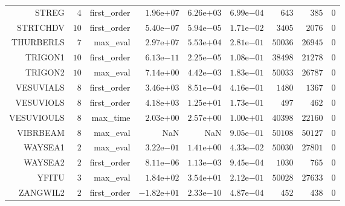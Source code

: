 \begin{longtable}{rrrrrrrrr}
STREG & \(     4\) & first\_order & \( 1.96\)e\(+07\) & \( 6.26\)e\(+03\) & \( 6.99\)e\(-04\) & \(   643\) & \(   385\) & \(     0\) \\
STRTCHDV & \(    10\) & first\_order & \( 5.40\)e\(-07\) & \( 5.94\)e\(-05\) & \( 1.71\)e\(-02\) & \(  3405\) & \(  2076\) & \(     0\) \\
THURBERLS & \(     7\) & max\_eval & \( 2.97\)e\(+07\) & \( 5.53\)e\(+04\) & \( 2.81\)e\(-01\) & \( 50036\) & \( 26945\) & \(     0\) \\
TRIGON1 & \(    10\) & first\_order & \( 6.13\)e\(-11\) & \( 2.25\)e\(-05\) & \( 1.08\)e\(-01\) & \( 38498\) & \( 21278\) & \(     0\) \\
TRIGON2 & \(    10\) & max\_eval & \( 7.14\)e\(+00\) & \( 4.42\)e\(-03\) & \( 1.83\)e\(-01\) & \( 50033\) & \( 26787\) & \(     0\) \\
VESUVIALS & \(     8\) & first\_order & \( 3.46\)e\(+03\) & \( 8.51\)e\(-04\) & \( 4.16\)e\(-01\) & \(  1480\) & \(  1367\) & \(     0\) \\
VESUVIOLS & \(     8\) & first\_order & \( 4.18\)e\(+03\) & \( 1.25\)e\(+01\) & \( 1.73\)e\(-01\) & \(   497\) & \(   462\) & \(     0\) \\
VESUVIOULS & \(     8\) & max\_time & \( 2.03\)e\(+00\) & \( 2.57\)e\(+00\) & \( 1.00\)e\(+01\) & \( 40398\) & \( 22160\) & \(     0\) \\
VIBRBEAM & \(     8\) & max\_eval &       NaN &       NaN & \( 9.05\)e\(-01\) & \( 50108\) & \( 50127\) & \(     0\) \\
WAYSEA1 & \(     2\) & max\_eval & \( 3.22\)e\(-01\) & \( 1.41\)e\(+00\) & \( 4.33\)e\(-02\) & \( 50030\) & \( 27801\) & \(     0\) \\
WAYSEA2 & \(     2\) & first\_order & \( 8.11\)e\(-06\) & \( 1.13\)e\(-03\) & \( 9.45\)e\(-04\) & \(  1030\) & \(   765\) & \(     0\) \\
YFITU & \(     3\) & max\_eval & \( 1.84\)e\(+02\) & \( 3.54\)e\(+01\) & \( 2.12\)e\(-01\) & \( 50028\) & \( 27633\) & \(     0\) \\
ZANGWIL2 & \(     2\) & first\_order & \(-1.82\)e\(+01\) & \( 2.33\)e\(-10\) & \( 4.87\)e\(-04\) & \(   452\) & \(   438\) & \(     0\) \\\hline
\end{longtable}
